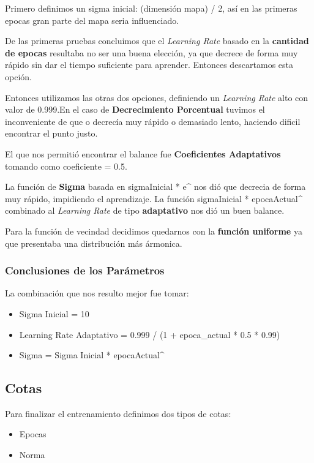 Primero definimos un sigma inicial: (dimensión mapa) / 2, así en las primeras
epocas gran parte del mapa seria influenciado.

De las primeras pruebas concluimos que el \emph{Learning Rate} basado en la 
\textbf{cantidad de epocas} resultaba no ser una buena elección, ya que
decrece de forma muy rápido sin dar el tiempo suficiente para aprender.
Entonces descartamos esta opción.

Entonces utilizamos las otras dos opciones, definiendo un \emph{Learning Rate}
alto con valor de 0.999.En el caso de \textbf{Decrecimiento Porcentual}
tuvimos el inconveniente de que o decrecía muy rápido o demasiado lento, haciendo
dificil encontrar el punto justo.

El que nos permitió encontrar el balance fue \textbf{Coeficientes Adaptativos}
tomando como coeficiente = 0.5.

La función de \textbf{Sigma} basada en sigmaInicial * e^
nos dió que decrecia de forma muy rápido, impidiendo el aprendizaje.
La función sigmaInicial * {epocaActual^} combinado al \emph{Learning Rate}
de tipo \textbf{adaptativo} nos dió un buen balance.

Para la función de vecindad decidimos quedarnos con la \textbf{función uniforme} ya
que presentaba una distribución más ármonica.

\subsubsection{Conclusiones de los Parámetros}

La combinación que nos resulto mejor fue tomar:


\begin{itemize}
	\item Sigma Inicial = 10
	\item Learning Rate Adaptativo = 0.999 / (1 + epoca_actual * 0.5 * 0.99)
	\item Sigma = Sigma Inicial * {epocaActual^}
\end{itemize}


\subsection{Cotas}

Para finalizar el entrenamiento definimos dos tipos de cotas:

\begin{itemize}
	\item Epocas
	\item Norma
\end{itemize}

